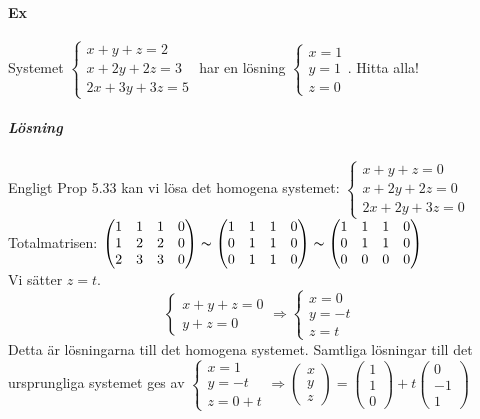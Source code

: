 \paragraph{Ex} Systemet $\begin{cases}
    x+y+z=2\\x+2y+2z=3\\2x+3y+3z=5
\end{cases}$ har en lösning $\begin{cases}
    x=1\\y=1\\z=0
\end{cases}$.
Hitta alla!
\subparagraph{Lösning} Engligt Prop 5.33 kan vi lösa det homogena systemet:
$\begin{cases}
    x+y+z=0\\
    x+2y+2z=0\\
    2x+2y+3z=0
\end{cases}$
Totalmatrisen: $\begin{pmatrix}
    1&1&1&0\\
    1&2&2&0\\
    2&3&3&0
\end{pmatrix}
\thicksim
\begin{pmatrix}
    1&1&1&0\\
    0&1&1&0\\
    0&1&1&0
\end{pmatrix}
\thicksim
\begin{pmatrix}
    1&1&1&0\\
    0&1&1&0\\
    0&0&0&0
\end{pmatrix}$\\
Vi sätter $z=t$.
\begin{equation*}
    \begin{cases}
        x+y+z=0\\
        y+z=0
    \end{cases}
    \Rightarrow
    \begin{cases}
        x=0\\
        y=-t\\
        z=t
    \end{cases}
\end{equation*}
Detta är lösningarna till det homogena systemet.
Samtliga lösningar till det ursprungliga systemet ges av $\begin{cases}
    x=1\\
    y=-t\\
    z=0+t
\end{cases}
\Rightarrow
\begin{pmatrix}
    x\\y\\z
\end{pmatrix}=
\begin{pmatrix}
    1\\1\\0
\end{pmatrix}+t\begin{pmatrix}
    0\\-1\\1
\end{pmatrix}$


